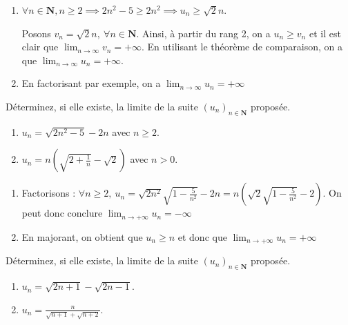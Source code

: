\documentclass[a4paper,12pt,french]{article}
\newcommand{\N}{\mathbf{N}}
\begin{document}
\begin{Answer}
  \begin{enumerate}[label=\alph*)]
    \item $\forall n\in \N, n\geqslant 2 \implies 2n^2 - 5 \geqslant
      2n^2 \implies u_n \geqslant \sqrt2 n$.

      Posons $v_n = \sqrt2 n,\ \forall n\in \N$. Ainsi, à partir du rang
      2, on a $u_n \geqslant v_n$ et il est clair que
      $\lim_{n\to\infty}v_n = +\infty$. En utilisant le théorème de
      comparaison, on a que $\lim_{n\to\infty}u_n = +\infty$.
    \item En factorisant par exemple, on a $\lim_{n\to\infty}u_n =
      +\infty$
  \end{enumerate}
\end{Answer}

\begin{Exercise}
  Déterminez, si elle existe, la limite de la suite $(u_n)_{n\in\N}$
  proposée.
  \begin{enumerate}[label=\alph*)]
    \item $u_n = \sqrt{2n^2 - 5} - 2n$ avec $n \geqslant 2$.
    \item $u_n = n\left(\sqrt{2 + \frac1n} - \sqrt2 \right)$ avec $n>0$.
  \end{enumerate}
\end{Exercise}

\begin{Answer}
  \begin{enumerate}[label=\alph*)]
    \item Factorisons : $\forall n\geqslant 2 ,\ u_n = \sqrt{2n^2}
      \sqrt{1 - \frac5{n^2}} -2n = n\left(\sqrt2 \sqrt{1-\frac5{n^2}} -
      2 \right)$. On peut donc conclure $\lim_{n\to+\infty}u_n = -\infty$
    \item En majorant, on obtient que $u_n \geqslant n$ et donc que
    $\lim_{n\to+\infty}u_n = +\infty$
  \end{enumerate}
\end{Answer}

\begin{Exercise}
  Déterminez, si elle existe, la limite de la suite $(u_n)_{n\in\N}$
  proposée.
  \begin{enumerate}[label=\alph*)]
    \item $u_n = \sqrt{2n+1}-\sqrt{2n-1}$.
    \item $u_n = \frac{n}{\sqrt{n+1}+\sqrt{n+2}}$.
  \end{enumerate}
\end{Exercise}
\end{document}
